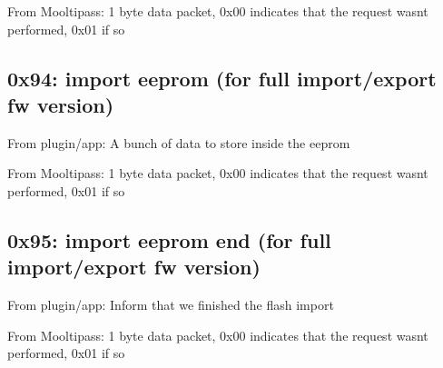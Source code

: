 From Mooltipass\+: 1 byte data packet, 0x00 indicates that the request wasn\textquotesingle{}t performed, 0x01 if so

\subsection*{0x94\+: import eeprom (for full import/export fw version) }

From plugin/app\+: A bunch of data to store inside the eeprom

From Mooltipass\+: 1 byte data packet, 0x00 indicates that the request wasn\textquotesingle{}t performed, 0x01 if so

\subsection*{0x95\+: import eeprom end (for full import/export fw version) }

From plugin/app\+: Inform that we finished the flash import

From Mooltipass\+: 1 byte data packet, 0x00 indicates that the request wasn\textquotesingle{}t performed, 0x01 if so 